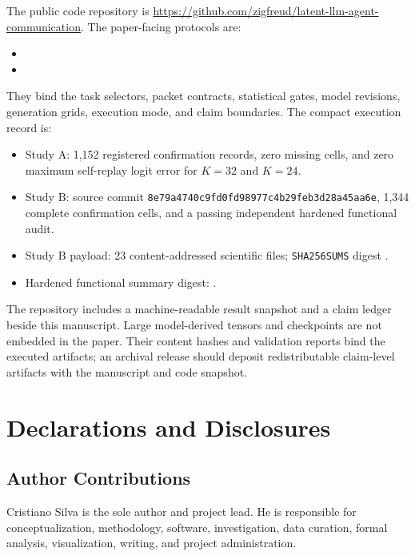 \documentclass[11pt]{article}
\begin{document}
The public code repository is \url{https://github.com/zigfreud/latent-llm-agent-communication}. The paper-facing protocols are:

\begin{itemize}
  \item {}
  \item {}
\end{itemize}

They bind the task selectors, packet contracts, statistical gates, model revisions, generation grids, execution mode, and claim boundaries. The compact execution record is:

\begin{itemize}
  \item Study A: 1,152 registered confirmation records, zero missing cells, and zero maximum self-replay logit error for \(K=32\) and \(K=24\).
  \item Study B: source commit \texttt{8e79a4740c9fd0fd98977c4b29feb3d28a45aa6e}, 1,344 complete confirmation cells, and a passing independent hardened functional audit.
  \item Study B payload: 23 content-addressed scientific files; \texttt{SHA256SUMS} digest \texttt{}.
  \item Hardened functional summary digest: \texttt{}.
\end{itemize}

The repository includes a machine-readable result snapshot and a claim ledger beside this manuscript. Large model-derived tensors and checkpoints are not embedded in the paper. Their content hashes and validation reports bind the executed artifacts; an archival release should deposit redistributable claim-level artifacts with the manuscript and code snapshot.

\section{Declarations and Disclosures}

\subsection{Author Contributions}

Cristiano Silva is the sole author and project lead. He is responsible for conceptualization, methodology, software, investigation, data curation, formal analysis, visualization, writing, and project administration.
\end{document}
